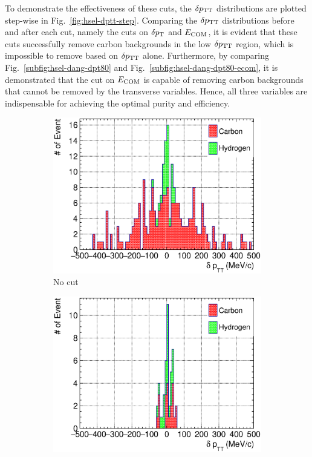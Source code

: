      To demonstrate the effectiveness of these cuts, the $\delta p_\textrm{TT}$ distributions are plotted step-wise in Fig.~\ref{fig:hsel-dptt-step}.
     Comparing the $\delta p_\textrm{TT}$ distributions before and after each cut, namely the cuts on $\delta p_\textrm{T}$ and $E_{\textrm{COM}}$, it is evident that these cuts successfully remove carbon backgrounds in the low $\delta p_\textrm{TT}$ region, which is impossible to remove based on $\delta p_\textrm{TT}$ alone.
     Furthermore, by comparing Fig.~\ref{subfig:hsel-dang-dpt80} and Fig.~\ref{subfig:hsel-dang-dpt80-ecom}, it is demonstrated that the cut on $E_{\textrm{COM}}$ is capable of removing carbon backgrounds that cannot be removed by the transverse variables.
     Hence, all three variables are indispensable for achieving the optimal purity and efficiency.
     \begin{figure}
     \begin{subfigure}[b]{\trfigwid\textwidth}
          \centering
          \includegraphics[width=\textwidth]{figures/perf/tki/SFGpTPCmu_dptt_stack_al15.eps}
          \caption{No cut}
          \label{subfig:hsel-dang-nocut}
     \end{subfigure}
     \begin{subfigure}[b]{\trfigwid\textwidth}
          \centering
          \includegraphics[width=\textwidth]{figures/perf/tki/SFGpTPCmu_dptt_stack_al15_dpt80.eps}

\end{subfigure}
\end{figure}
